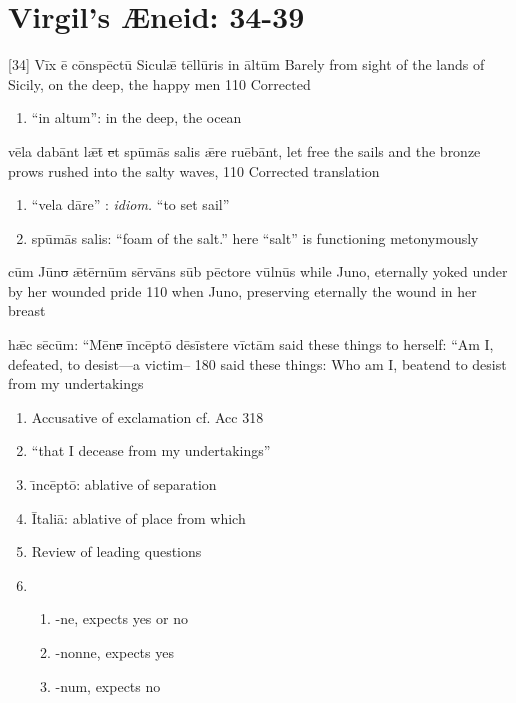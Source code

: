 \section{Virgil's {\AE}neid:  34-39} %

\latline
  {[34] V\=ix \={\macron e} c\={\macron o}nsp\=ect\={\macron u} S\-ic\-ul\={\ae} t\=ell\={\macron u}r\-is \-in \=alt\=um }
  {Barely from sight of the lands of Sicily, on the deep, the happy men}
  {110} %
  {Corrected}
  {
	\begin{enumerate}
		\item ``in altum'':  in the deep, the ocean
	\end{enumerate}
  }

\latline
  {v\={\macron e}l\-a d\-ab\=ant l\={\ae}t\={\macron{\i}}\sout{ e}t sp\={\macron u}m\={\macron a}s s\-al\-is \={\ae}r\-e r\-u\={\macron e}b\=ant,}
  {let free the sails and the bronze prows rushed into the salty waves,  }
  {110} %
  {Corrected translation}
  {
	\begin{enumerate}
		\item ``vela d\={a}re'' :  \emph{idiom.} ``to set sail''
		\item sp\={u}m\={a}s salis:  ``foam of the salt.''  here ``salt'' is functioning metonymously
	\end{enumerate}
  }

\latline
  {c\=um J\={\macron u}n\sout{o }\={\ae}t\=ern\=um s\=erv\={\macron a}ns s\=ub p\=ect\-or\-e v\=uln\={\macron u}s}
  {while Juno, eternally yoked under by her wounded pride}
  {110} %
  {when Juno, preserving eternally the wound in her breast}
  {
  }


\latline
  {h\={\ae}c s\={\macron e}c\=um:  ``M\={\macron e}n\sout{e }\=inc\=ept\={\macron o} d\={\macron e}s\=ist\-er\-e v\=ict\=am}
  {said these things to herself:  ``Am I, defeated, to desist---a victim--}
  {180} %
  {said these things:  Who am I, beatend to desist from my undertakings}
  {
	\begin{enumerate}
		\item Accusative of exclamation cf. Acc 318
		\item ``that I decease from my undertakings''
		\item \={\i}nc\={e}pt\={o}:  ablative of separation
		\item \={I}tali\={a}:  ablative of place from which
		\item Review of leading questions
		\item \begin{enumerate}
			\item -ne, expects yes or no
			\item -nonne, expects yes
			\item -num, expects no
		\end{enumerate}
	\end{enumerate}
  }

